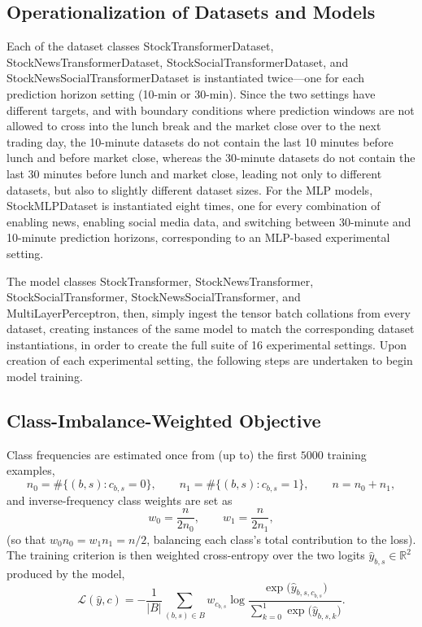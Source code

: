 \documentclass[stu,floatsintext]{apa7}
\newcommand{\R}{\mathbb{R}}
\begin{document}
\subsection{Operationalization of Datasets and Models}

Each of the dataset classes StockTransformerDataset, StockNewsTransformerDataset, StockSocialTransformerDataset, and StockNewsSocialTransformerDataset is instantiated twice—one for each prediction horizon setting (10-min or 30-min). Since the two settings have different targets, and with boundary conditions where prediction windows are not allowed to cross into the lunch break and the market close over to the next trading day, the 10-minute datasets do not contain the last 10 minutes before lunch and before market close, whereas the 30-minute datasets do not contain the last 30 minutes before lunch and market close, leading not only to different datasets, but also to slightly different dataset sizes. For the MLP models, StockMLPDataset is instantiated eight times, one for every combination of enabling news, enabling social media data, and switching between 30-minute and 10-minute prediction horizons, corresponding to an MLP-based experimental setting.

The model classes StockTransformer, StockNewsTransformer, StockSocialTransformer, StockNewsSocialTransformer, and MultiLayerPerceptron, then, simply ingest the tensor batch collations from every dataset, creating instances of the same model to match the corresponding dataset instantiations, in order to create the full suite of 16 experimental settings. Upon creation of each experimental setting, the following steps are undertaken to begin model training.

\subsection{Class-Imbalance-Weighted Objective}

Class frequencies are estimated once from (up to) the first $5000$ training examples,
\begin{equation}
  n_0 = \#\{(b,s): c_{b,s}=0\}, \qquad n_1 = \#\{(b,s): c_{b,s}=1\}, \qquad n=n_0+n_1,
\end{equation}
and inverse-frequency class weights are set as
\begin{equation}
  w_0 = \frac{n}{2n_0}, \qquad w_1 = \frac{n}{2n_1},
\end{equation}
(so that $w_0 n_0 = w_1 n_1 = n/2$, balancing each class's total contribution to the loss). The training
criterion is then weighted cross-entropy over the two logits $\hat y_{b,s}\in\R^2$ produced by the model,
\begin{equation}
  \mathcal L(\hat y, c) = -\frac{1}{|B|}\sum_{(b,s)\in B} w_{c_{b,s}}
  \log\frac{\exp\bigl(\hat y_{b,s,c_{b,s}}\bigr)}{\sum_{k=0}^{1}\exp\bigl(\hat y_{b,s,k}\bigr)}.
\end{equation}
\end{document}
